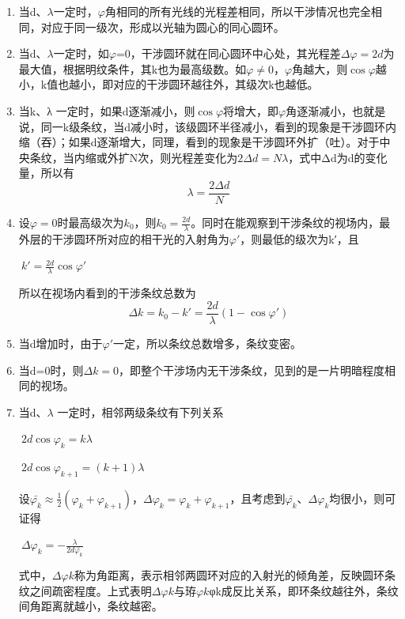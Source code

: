 \documentclass[11pt,a4paper,oneside]{article}
\begin{document}
\begin{enumerate}
\item 当d、$\lambda$一定时，$\varphi$角相同的所有光线的光程差相同，所以干涉情况也完全相同，对应于同一级次，形成以光轴为圆心的同心圆环。
\item 当d、$\lambda$一定时，如$\varphi$=0，干涉圆环就在同心圆环中心处，其光程差${\Delta}{\varphi}=2d$为最大值，根据明纹条件，其k也为最高级数。如${\varphi}{\neq}0$，$\varphi$角越大，则$\cos{\varphi}$越小，k值也越小，即对应的干涉圆环越往外，其级次k也越低。
\item 当k、λ 一定时，如果d逐渐减小，则$\cos{\varphi}$将增大，即$\varphi$角逐渐减小，也就是说，同一k级条纹，当d减小时，该级圆环半径减小，看到的现象是干涉圆环内缩（吞）；如果d逐渐增大，同理，看到的现象是干涉圆环外扩（吐）。对于中央条纹，当内缩或外扩N次，则光程差变化为$2{\Delta}d = N{\lambda}$，式中Δd为d的变化量，所以有$${\lambda} =\displaystyle\frac{2{\Delta}d}{N}$$
\item 设${\varphi}=0$时最高级次为$k_0$，则$k_0 =\displaystyle\frac{2d}{\lambda}$。同时在能观察到干涉条纹的视场内，最外层的干涉圆环所对应的相干光的入射角为${\varphi}'$，则最低的级次为k′，且
\begin{center}
$\displaystyle\ {k}' = \displaystyle\frac{2d}{\lambda }\cos {\varphi }'$
\end{center}


所以在视场内看到的干涉条纹总数为
$${\displaystyle\Delta}k = k_{0}-k' = \displaystyle\frac{2d}{\lambda}( 1-\cos{\varphi}')$$

\item 当d增加时，由于$\varphi'$一定，所以条纹总数增多，条纹变密。
\item 当d=0时，则${\Delta}k=0$，即整个干涉场内无干涉条纹，见到的是一片明暗程度相同的视场。
\item 当d、$\lambda$ 一定时，相邻两级条纹有下列关系
\begin{center}
$\displaystyle\ 2d\cos\varphi  _{k} = k{\lambda}$
\end{center}
\begin{center}
$\displaystyle\ 2d\cos\varphi  _{k+1} = \left ( k+1 \right )\lambda  $
\end{center}
设$\bar{\varphi _{k}}\approx \displaystyle\frac{1}{2}\left ( \varphi _{k}+\varphi _{k+1} \right )，\Delta \varphi _{k} = \varphi _{k}+\varphi _{k+1}$，且考虑到$\bar{\varphi _{k}}、\Delta \varphi _{k}$均很小，则可证得
\begin{center}
$\displaystyle\ \Delta \varphi _{k} = -\displaystyle\frac{\lambda }{2d\bar{\varphi _{k}}} $
\end{center}
式中，${\Delta}{\varphi}k$称为角距离，表示相邻两圆环对应的入射光的倾角差，反映圆环条纹之间疏密程度。上式表明${\Delta}{\varphi}k$与珔${\varphi}k$φk成反比关系，即环条纹越往外，条纹间角距离就越小，条纹越密。
\end{enumerate}
\end{document}
